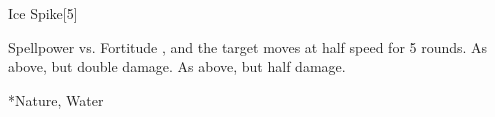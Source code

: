 \begin{spellsection}{Ice Spike}[5]
    \begin{spellheader}
    \end{spellheader}
    \begin{spellcontent}
        \begin{spelltargetinginfo}
        \end{spelltargetinginfo}
        \begin{spelleffects}
            \begin{spellattack}{Spellpower vs. Fortitude}
                \spellsuccess {}, and the target moves at half speed for 5 rounds.
                \spellcritical As above, but double damage.
                \spellfailure As above, but half damage.
            \end{spellattack}
        \end{spelleffects}
    \end{spellcontent}
    \begin{spellfooter}
        *{Nature, Water}
        \miscastexplode
    \end{spellfooter}
    \begin{spellaugments}
    \end{spellaugments}
\end{spellsection}

